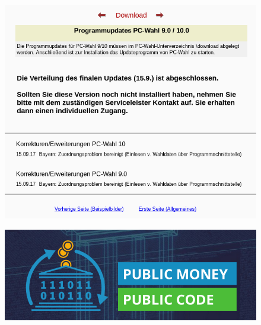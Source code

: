 \begin{frame}
	\begin{figure}
		\includegraphics[scale=0.4]{resources/pcwahl10.png}
	\end{figure}
\end{frame}

\begin{frame}
	\begin{figure}
		\includegraphics[scale=0.45]{resources/pmpc.png}
	\end{figure}
\end{frame}